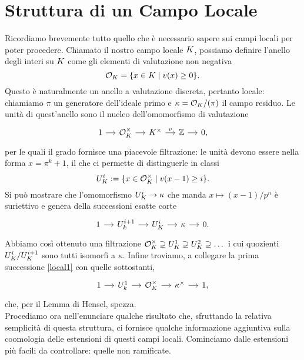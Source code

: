 \section{Struttura di un Campo Locale}
Ricordiamo brevemente tutto quello che è necessario sapere sui campi locali per poter procedere. Chiamato il nostro campo locale $ K $, possiamo definire l'anello degli interi su $ K $ come gli elementi di valutazione non negativa
\[ \mathcal{O}_{K} = \{ x \in K \mid v(x)\geq 0 \}. \]
Questo è naturalmente un anello a valutazione discreta, pertanto locale: chiamiamo $ \pi $ un generatore dell'ideale primo e $ \kappa = \mathcal{O}_{K}/(\pi) $ il campo residuo. Le unità di quest'anello sono il nucleo dell'omomorfismo di valutazione
\begin{equation}\label{local1}
	\begin{tikzcd}[column sep = small]
	1 \rar
	& \mathcal{O}_{\K}^\times \rar
	& \K^\times \rar["v"]
	& \Z \rar
	& 0,
	\end{tikzcd}
\end{equation}
per le quali il grado fornisce una piacevole filtrazione: le unità devono essere nella forma $ x = \pi^k +1 $, il che ci permette di distinguerle in classi  $$  U_{K}^i :=\{x \in \mathcal{O}_{K}^\times \mid v(x-1) \geq i \}.  $$ Si può mostrare che l'omomorfismo $ U_{K}^i \to \kappa $ che manda $ x \mapsto (x-1)/p^n $ è suriettivo e genera della successioni esatte corte
\begin{equation}\label{local2}
\begin{tikzcd}[column sep = small]
1 \rar
& U_k^{i+1} \rar
& U_{\K}^i \rar
& \kappa \rar
& 0.
\end{tikzcd}
\end{equation}
Abbiamo così ottenuto una filtrazione $ \mathcal{O}_{K}^\times \supseteq U_{K}^1 \supseteq U_{K}^2 \supseteq \dots $ 
i cui quozienti $ U_{K}^i / U_{K}^{i+1} $ sono tutti isomorfi a $ \kappa $.
Infine troviamo, a collegare la prima successione \eqref{local1} con quelle sottostanti, 
\begin{equation}\label{local3}
	\begin{tikzcd}[column sep = small]
	1 \rar
	& U_k^{1} \rar
	& \mathcal{O}_{\K}^\times \rar
	& \kappa^\times \rar
	&1,
	\end{tikzcd}
\end{equation}
che, per il Lemma di Hensel, spezza.\\

Procediamo ora nell'enunciare qualche risultato che, sfruttando la relativa semplicità di questa struttura, ci fornisce qualche informazione aggiuntiva sulla coomologia delle estensioni di questi campi locali. Cominciamo dalle estensioni più facili da controllare: quelle non ramificate.


